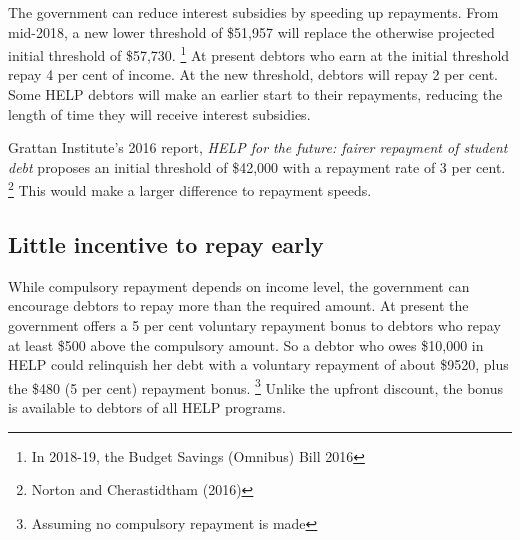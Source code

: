 \documentclass[embargoed]{grattan}
\begin{document}
The government can reduce interest subsidies by speeding up repayments.
From mid-2018, a new lower threshold of \$51,957 will replace the otherwise projected initial threshold of \$57,730.%
\footnote{In 2018-19, the Budget Savings (Omnibus) Bill 2016} At present debtors who earn at the initial threshold repay 4 per cent of income.
At the new threshold, debtors will repay 2 per cent.
Some \gls{HELP} debtors will make an earlier start to their repayments, reducing the length of time they will receive interest subsidies.

Grattan Institute's 2016 report, \emph{HELP for the future: fairer repayment of student debt} proposes an initial threshold of \$42,000 with a repayment rate of 3 per cent.%
\footnote{Norton and Cherastidtham (2016)} This would make a larger difference to repayment speeds.

\subsection{Little incentive to repay early}\label{little-incentive-to-repay-early}

While compulsory repayment depends on income level, the government can encourage debtors to repay more than the required amount.
At present the government offers a 5 per cent voluntary repayment bonus to debtors who repay at least \$500 above the compulsory amount.
So a debtor who owes \$10,000 in \gls{HELP} could relinquish her debt with a voluntary repayment of about \$9520, plus the \$480 (5 per cent) repayment bonus.%
\footnote{Assuming no compulsory repayment is made} Unlike the upfront discount, the bonus is available to debtors of all \gls{HELP} programs.
\end{document}
